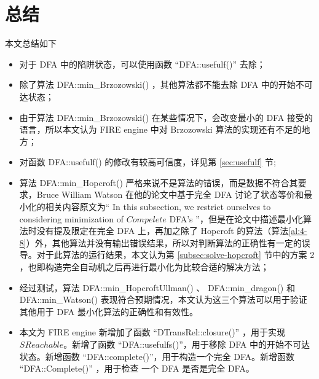 \chapter{总结}

本文总结如下
\begin{itemize}
    \item 对于 DFA 中的陷阱状态，可以使用函数 “DFA::usefulf()” 去除；
    \item 除了算法 DFA::min\_Brzozowski() ，其他算法都不能去除 DFA 中的开始不可达状态；
    \item 由于算法 DFA::min\_Brzozowski() 在某些情况下，会改变最小的 DFA 接受的语言，所以本文认为 FIRE engine 中对 Brzozowski 算法的实现还有不足的地方；
    \item 对函数 DFA::usefulf() 的修改有较高可信度，详见第 \ref{sec:usefulf} 节;
    \item 算法 DFA::min\_Hopcroft() 严格来说不是算法的错误，而是数据不符合其要求，Bruce William Watson 在他的论文\cite[第三节]{watson1993taxonomyb}中基于完全 DFA 讨论了状态等价和最小化的相关内容原文为“ In this subsection, we restrict ourselves to considering minimization of $Compelete$ DFA's ”，但是在论文\cite[第四节]{watson1993taxonomyb}中描述最小化算法时没有提及限定在完全 DFA 上，再加之除了 Hopcroft 的算法（算法\ref{al:4-8}）外，其他算法并没有输出错误结果，所以对判断算法的正确性有一定的误导。对于此算法的运行结果，本文认为第 \ref{subsec:solve-hopcroft} 节中的方案 2 ，也即构造完全自动机之后再进行最小化为比较合适的解决方法；
    \item 经过测试，算法 DFA::min\_HopcroftUllman() 、 DFA::min\_dragon() 和 DFA::min\_Watson() 表现符合预期情况，本文认为这三个算法可以用于验证其他用于 DFA 最小化算法的正确性和有效性。
    \item 本文为 FIRE engine 新增加了函数 “DTransRel::closure()” ，用于实现 $SReachable$。新增了函数 “DFA::usefulfs()”，用于移除 DFA 中的开始不可达状态。新增函数 “DFA::complete()”，用于构造一个完全 DFA。新增函数 “DFA::Complete()” ，用于检查 一个 DFA 是否是完全 DFA。
\end{itemize}


